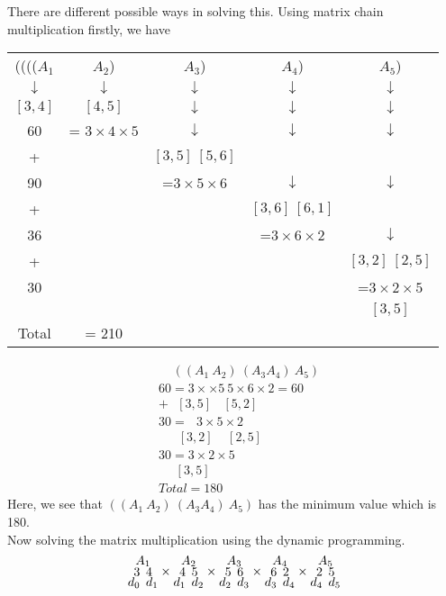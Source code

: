 \documentclass[12pt]{report}
\begin{document}
There are different possible ways in solving this. Using matrix chain multiplication firstly, we have
\begin{table}[h]
	\begin{tabular}{ccccc}
		(((($A_1$ & $A_2$)& $A_3$)& $A_4$) & $A_5$)\\
		$\downarrow$ & $\downarrow$ &$\downarrow$ &$\downarrow$ &$\downarrow$ \\
		$[3,4]$ &$[4,5]$ &$\downarrow$ &$\downarrow$ &$\downarrow$\\
		60 &= $3 \times 4 \times 5$ &$\downarrow$&$\downarrow$&$\downarrow$\\
		+ & & $[3,5]~[5,6]$& &\\
		90 & & =$3\times 5\times 6$ &$\downarrow$ &$\downarrow$\\
		+ &&& $[3,6]~[6,1]$ &\\
		36 & & & =$3\times 6\times 2$ & $\downarrow$\\
		+ &&& & $[3,2]~[2,5]$\\
		30 & & & & =$3\times 2\times 5$  \\
		&&&& $[3,5]$\\
		Total & = 210 &&&
	\end{tabular}
\end{table}
\begin{align*}
	&~~~~~((A_1 ~ A_2)~(A_3 A_4)~A_5)\\
	&60 = 3\times \times 5 ~ 5\times 6 \times 2 = 60\\
	&+ ~~~[3,5 ] ~~~~ [5,2]\\
	&30 = ~~~ 3\times 5 \times 2\\
	&~~~~~~~[3,2] ~~~~~ [2,5]\\
	&30 = 3\times 2\times 5\\
	&~~~~~~ [3,5]\\
	&Total = 180
\end{align*}
Here, we see that $((A_1 ~ A_2)~(A_3 A_4)~A_5)$ has the minimum value which is 180.\\
Now solving the matrix multiplication using the dynamic programming.
\begin{align*}
	\Large\substack{A_1\\{3 ~ 4}\\{d_0~d_1}}\times \substack{A_2\\{4 ~ 5}\\{d_1~d_2}}\times \substack{A_3\\{5 ~ 6}\\{d_2~d_3}}\times \substack{A_4\\{6 ~ 2}\\{d_3~d_4}}\times \substack{A_5\\{2 ~ 5}\\{d_4~d_5}}
\end{align*}
\end{document}
